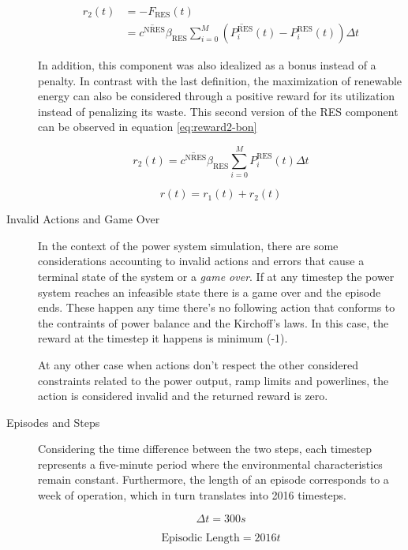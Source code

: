 \begin{description}
	\begin{equation} \label{eq:reward2-pen}
		\begin{split}
			r_2(t) &= - F_\text{RES}(t) \\
			&= \overline{c^\text{NRES}} \beta_\text{RES} \sum^M_{i=0} (\overline{P^\text{RES}_i}(t) - P^\text{RES}_i(t)) \Delta t 
		\end{split}
	\end{equation}
	
	In addition, this component was also idealized as a bonus instead of a penalty. In contrast with the last definition, the maximization of renewable energy can also be considered through a positive reward for its utilization instead of penalizing its waste. This second version of the \ac{RES} component can be observed in equation \ref{eq:reward2-bon}\par
	
	\begin{equation} \label{eq:reward2-bon}
		r_2(t) = \overline{c^\text{NRES}} \beta_\text{RES} \sum^M_{i=0} P^\text{RES}_i(t) \Delta t 
	\end{equation}
	
	\begin{equation}
		r(t) = r_1(t) + r_2(t)
	\end{equation}
	
	\item[Invalid Actions and Game Over] In the context of the power system simulation, there are some considerations accounting to invalid actions and errors that cause a terminal state of the system or a \textit{game over}. If at any timestep the power system reaches an infeasible state there is a game over and the episode ends. These happen any time there's no following action that conforms to the contraints of power balance and the Kirchoff's laws. In this case, the reward at the timestep it happens is minimum (-1). \par
	At any other case when actions don't respect the other considered constraints related to the power output, ramp limits and powerlines, the action is considered invalid and the returned reward is zero.
	
	
	\item[Episodes and Steps] Considering the time difference between the two steps, each timestep represents a five-minute period where the environmental characteristics remain constant. Furthermore, the length of an episode corresponds to a week of operation, which in turn translates into 2016 timesteps. \par

	
	\begin{equation}
		\Delta t = 300 s
	\end{equation}
	
	\begin{equation}
		\text{Episodic Length} = 2016 t
	\end{equation}
	
\end{description}

